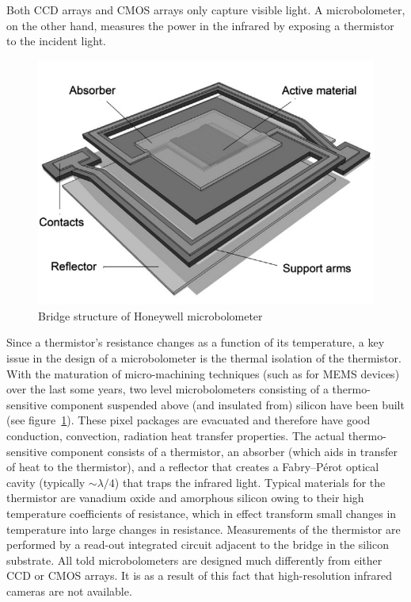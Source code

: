 Both CCD arrays and CMOS arrays only capture visible light.
%
A microbolometer, on the other hand, measures the power in the infrared by exposing a thermistor to the incident light.
%
\begin{figure}[b]
    \center
    \includegraphics[width=.7\linewidth,keepaspectratio]{figures/microbolometer2.png}
    \caption{Bridge structure of Honeywell microbolometer\cite{KESIM2014245}}
    \label{fig:microbolometer}
\end{figure}
%
Since a thermistor's resistance changes as a function of its temperature, a key issue in the design of a microbolometer is the thermal isolation of the thermistor.
%
With the maturation of micro-machining techniques (such as for MEMS devices) over the last some years, two level microbolometers consisting of a thermo-sensitive component suspended above (and insulated from) silicon have been built (see figure~\ref{fig:microbolometer}).
%
These pixel packages are evacuated and therefore have good conduction, convection, radiation heat transfer properties.
%
The actual thermo-sensitive component consists of a thermistor, an absorber (which aids in transfer of heat to the thermistor), and a reflector that creates a Fabry–Pérot optical cavity (typically ${\sim}\lambda/4$\cite{bolometer}) that traps the infrared light.
%
Typical materials for the thermistor are vanadium oxide and amorphous silicon owing to their high temperature coefficients of resistance\cite{bolometer}, which in effect transform small changes in temperature into large changes in resistance.
%
Measurements of the thermistor are performed by a read-out integrated circuit adjacent to the bridge in the silicon substrate.
%
All told microbolometers are designed much differently from either CCD or CMOS arrays.
%
It is as a result of this fact that high-resolution infrared cameras are not available.

